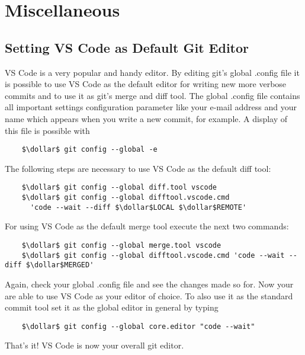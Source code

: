 \chapter{Miscellaneous}

\section{Setting VS Code as Default Git Editor}

VS Code is a very popular and handy editor. By editing git's global .config file it is possible to use VS Code as the default editor for writing 
new more verbose commits and to use it as git's merge and diff tool. The global .config file contains all important settings configuration parameter
like your e-mail address and your name which appears when you write a new commit, for example.
A display of this file is possible with
\begin{lstlisting}
	$\dollar$ git config --global -e
\end{lstlisting} 
The following steps are necessary to use VS Code as the default diff tool:
\begin{lstlisting}
	$\dollar$ git config --global diff.tool vscode
	$\dollar$ git config --global difftool.vscode.cmd 
	  'code --wait --diff $\dollar$LOCAL $\dollar$REMOTE'
\end{lstlisting}
For using VS Code as the default merge tool execute the next two commands:
\begin{lstlisting}
	$\dollar$ git config --global merge.tool vscode
	$\dollar$ git config --global difftool.vscode.cmd 'code --wait --diff $\dollar$MERGED'
\end{lstlisting}
Again, check your global .config file and see the changes made so for. Now your are able to use 
VS Code as your editor of choice. To also use it as the standard commit tool set it as the global editor in general by typing 
\begin{lstlisting}
	$\dollar$ git config --global core.editor "code --wait"
\end{lstlisting}
That's it! VS Code is now your overall git editor.

